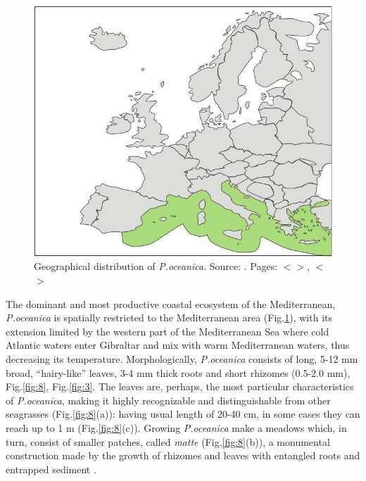 \documentclass[11pt]{article}
\begin{document}
\begin{figure}
	\centering
	\includegraphics[scale=0.20]{Fig-1-5.jpg}
	\caption{Geographical distribution of \textit{P.oceanica}. Source: \cite{Borum04}\label{Borum04}. Pages: $<$\pageref{page-4}$>$, $<$\pageref{page-5}$>$}
	\label{fig:5}
\end{figure}

The dominant and most productive coastal ecosystem of the Mediterranean, \textit{P.oceanica} is
spatially restricted to the Mediterranean area (Fig.\ref{fig:5}), 
with its extension limited by the western part of the Mediterranean Sea where cold Atlantic waters enter Gibraltar and mix with warm
Mediterranean waters, thus decreasing its temperature.
Morphologically, \textit{P.oceanica} consists of long, 5-12 mm broad, “hairy-like” leaves, 3-4 mm thick roots and short rhizomes (0.5-2.0 mm), Fig.\ref{fig:8}, Fig.\ref{fig:3}.\label{page-5}
The leaves are, perhaps, the most particular characteristics of \textit{P.oceanica}, making it highly recognizable and distinguishable from other seagrasses (Fig.\ref{fig:8}(a)): having usual length of 20-40 cm, in some cases they can reach up to 1 m \cite{Borum04}\label{Borum04}  (Fig.\ref{fig:8}(c)).
Growing \textit{P.oceanica} make a meadows which, in turn, consist of smaller patches, called \textit{matte}
(Fig.\ref{fig:8}(b)), a monumental construction made by the growth of rhizomes and leaves with entangled roots
and entrapped sediment \cite{Francour06}\label{Francour06}.
\end{document}
